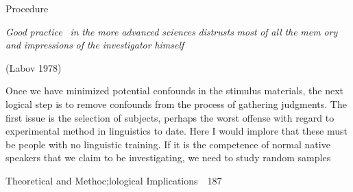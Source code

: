 \begin{styleHeadingviii}
Procedure
\end{styleHeadingviii}


\begin{styleStandard}
\textit{Good}\textit{ }\textit{practice }\textit{\ }\textit{in}\textit{ }\textit{the}\textit{ }\textit{more}\textit{ }\textit{advanced}\textit{ }\textit{sciences}\textit{ }\textit{distrusts}\textit{ }\textit{most}\textit{ }\textit{of}\textit{ }\textit{all}\textit{ }\textit{the}\textit{ }\textit{mem\-}\textit{ }\textit{ory}\textit{ }\textit{and}\textit{ }\textit{impressions}\textit{ }\textit{of}\textit{ }\textit{the}\textit{ }\textit{investigator}\textit{ }\textit{himself}
\end{styleStandard}


\begin{styleStandard}
(Labov 1978)
\end{styleStandard}


\begin{styleTextbody}
Once we have minimized potential confounds in the stimulus materials, the next logical step is to remove confounds from the process of gathering judgments. The first issue is the selection of subjects, perhaps the worst offense with regard to experimental method in linguistics to date. Here I would implore that these must be people with no linguistic training. If it is the competence of normal native speakers that we claim to be investigating, we need to study random samples
\end{styleTextbody}


\clearpage\setcounter{page}{1}\begin{styleStandard}
Theoretical and Methoc;lological Implications\ \ 187
\end{styleStandard}


